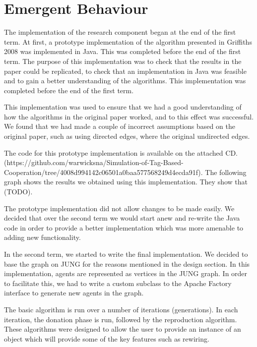 \section{Emergent Behaviour}

The implementation of the research component began at the end of the first term. At first, a prototype implementation of the algorithm presented in Griffiths 2008 was implemented in Java. This was completed before the end of the first term. The purpose of this implementation was to check that the results in the paper could be replicated, to check that an implementation in Java was feasible and to gain a better understanding of the algorithms. This implementation was completed before the end of the first term.

This implementation was used to ensure that we had a good understanding of how the algorithms in the original paper worked, and to this effect was successful. We found that we had made a couple of incorrect assumptions based on the original paper, such as using directed edges, where the original undirected edges. 

The code for this prototype implementation is available on the attached CD. (https://github.com/warwicksna/Simulation-of-Tag-Based-Cooperation/tree/4008d994142c06501a0baa577568249d4ecda91f). The following graph shows the results we obtained using this implementation. They show that (TODO).

The prototype implementation did not allow changes to be made easily. We decided that over the second term we would start anew and re-write the Java code in order to provide a better implementation which was more amenable to adding new functionality.

In the second term, we started to write the final implementation. We decided to base the graph on JUNG for the reasons mentioned in the design section. In this implementation, agents are represented as vertices in the JUNG graph. In order to facilitate this, we had to write a custom subclass to the Apache Factory interface to generate new agents in the graph.

The basic algorithm is run over a number of iterations (generations). In each iteration, the donation phase is run, followed by the reproduction algorithm. These algorithms were designed to allow the user to provide an instance of an object which will provide some of the key features such as rewiring.

